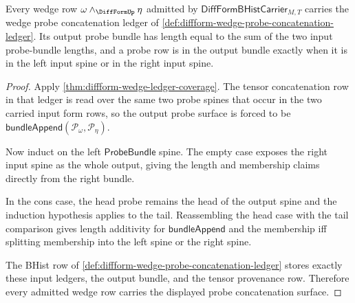 \begin{theorem}
\label{thm:diffform-wedge-probe-concatenation-coverage}
Every wedge row $\omega\wedge_{\DiffFormUp}\eta$ admitted by
$\mathsf{DiffFormBHistCarrier}_{M,T}$ carries the wedge probe concatenation
ledger of \autoref{def:diffform-wedge-probe-concatenation-ledger}. Its output
probe bundle has length equal to the sum of the two input probe-bundle lengths,
and a probe row is in the output bundle exactly when it is in the left input
spine or in the right input spine.
\end{theorem}
\begin{proof}
Apply \autoref{thm:diffform-wedge-ledger-coverage}. The tensor concatenation
row in that ledger is read over the same two probe spines that occur in the
two carried input form rows, so the output probe surface is forced to be
$\mathsf{bundleAppend}(\mathcal{P}_\omega,\mathcal{P}_\eta)$.

Now induct on the left $\mathsf{ProbeBundle}$ spine. The empty case exposes
the right input spine as the whole output, giving the length and membership
claims directly from the right bundle.

In the cons case, the head probe remains the head of the output spine and the
induction hypothesis applies to the tail. Reassembling the head case with the
tail comparison gives length additivity for
$\mathsf{bundleAppend}$ and the membership iff splitting membership into the
left spine or the right spine.

The BHist row of
\autoref{def:diffform-wedge-probe-concatenation-ledger} stores exactly these
input ledgers, the output bundle, and the tensor provenance row. Therefore
every admitted wedge row carries the displayed probe concatenation surface.
\end{proof}

